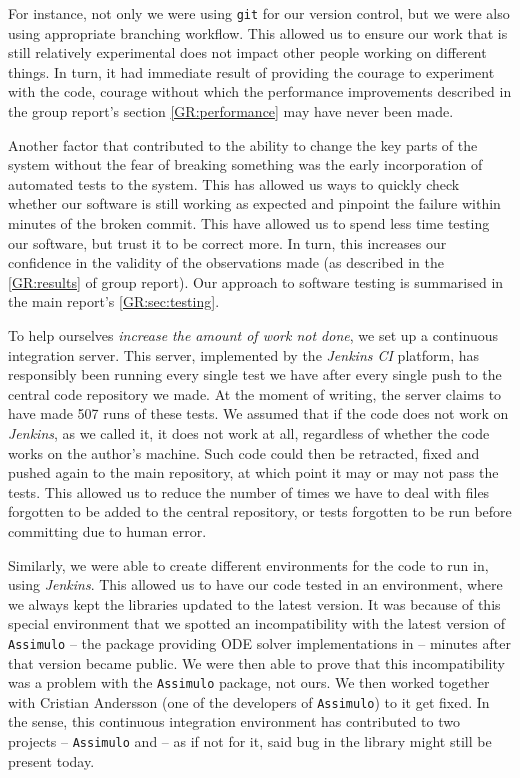 For instance, not only we were using \verb"git"\cite{git} for our version control, but we were also using appropriate branching workflow. 
This allowed us to ensure our work that is still relatively experimental does not impact other people working on different things. 
In turn, it had immediate result of providing the courage to experiment with the code, courage without which the performance improvements described in the group report's section \autoref*{GR:performance} may have never been made.

Another factor that contributed to the ability to change the key parts of the system without the fear of breaking something was the early incorporation of automated tests to the system. 
This has allowed us ways to quickly check whether our software is still working as expected and pinpoint the failure within minutes of the broken commit. 
This have allowed us to spend less time testing our software, but trust it to be correct more.
In turn, this increases our confidence in the validity of the observations made (as described in the \autoref*{GR:results} of group report). Our approach to software testing is summarised in the main report's \autoref*{GR:sec:testing}.

To help ourselves \emph{increase the amount of work not done}, we set up a continuous integration server. 
This server, implemented by the \emph{Jenkins CI} platform\cite{_jenkins_????}, has responsibly been running every single test we have after every single push to the central code repository we made. At the moment of writing, the server claims to have made 507 runs of these tests.
We assumed that if the code does not work on \emph{Jenkins}, as we called it, it does not work at all, regardless of whether the code works on the author's machine. 
Such code could then be retracted, fixed and pushed again to the main repository, at which point it may or may not pass the tests. 
This allowed us to reduce the number of times we have to deal with files forgotten to be added to the central repository, or tests forgotten to be run before committing due to human error.

Similarly, we were able to create different environments for the code to run in, using \emph{Jenkins}. 
This allowed us to have our code tested in an environment, where we always kept the libraries updated to the latest version. 
It was because of this special environment that we spotted an incompatibility with the latest version of \verb"Assimulo"\cite{andersson_christian_assimulo:_????} -- the package providing ODE solver implementations in \py{} -- minutes after that version became public. We were then able to prove that this incompatibility was a problem with the \verb"Assimulo" package, not ours. 
We then worked together with Cristian Andersson (one of the developers of \verb"Assimulo") to it get fixed. 
In the sense, this continuous integration environment has contributed to two projects -- \verb"Assimulo" and \means{} -- as if not for it, said bug in the library might still be present today.

